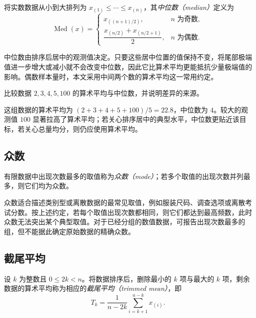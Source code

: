 \documentclass[UTF8,12pt,a4paper,fontset=fandol]{ctexart}
\begin{document}
\begin{definition}
将实数数据从小到大排列为 $x_{(1)}\le\cdots\le x_{(n)}$，其\emph{中位数（median）}定义为
\[
  \operatorname{Med}(x)=
  \begin{cases}
    x_{((n+1)/2)},&n\text{ 为奇数},\\
    \dfrac{x_{(n/2)}+x_{(n/2+1)}}{2},&n\text{ 为偶数}.
  \end{cases}
\]
\end{definition}

中位数由排序后居中的观测值决定。只要这些居中位置的值保持不变，将尾部极端值进一步增大或减小就不会改变中位数，因此它比算术平均更能抵抗少量极端值的影响。偶数样本量时，本文采用中间两个数的算术平均这一常用约定。

\begin{example}
比较数据 $2,3,4,5,100$ 的算术平均与中位数，并说明差异的来源。
\end{example}

\begin{solve}
这组数据的算术平均为 $(2+3+4+5+100)/5=22.8$，中位数为 $4$。较大的观测值 $100$ 显著拉高了算术平均；若关心排序居中的典型水平，中位数更贴近该目标，若关心总量均分，则仍应使用算术平均。
\end{solve}

\subsection{众数}

\begin{definition}
有限数据中出现次数最多的取值称为\emph{众数（mode）}；若多个取值的出现次数并列最多，则它们均为众数。
\end{definition}

众数适合描述类别型或离散数据的最常见取值，例如服装尺码、调查选项或离散考试分数。按上述约定，若每个取值出现次数都相同，则它们都达到最高频数，此时众数无法突出某个典型取值。对于已经分组的数值数据，可报告出现次数最多的组，但不能据此确定原始数据的精确众数。

\subsection{截尾平均}

\begin{definition}
设 $k$ 为整数且 $0\le2k<n$。将数据排序后，删除最小的 $k$ 项与最大的 $k$ 项，剩余数据的算术平均称为相应的\emph{截尾平均（trimmed mean）}，即
\[
  T_k=\frac{1}{n-2k}\sum_{i=k+1}^{n-k}x_{(i)}.
\]
\end{definition}
\end{document}
